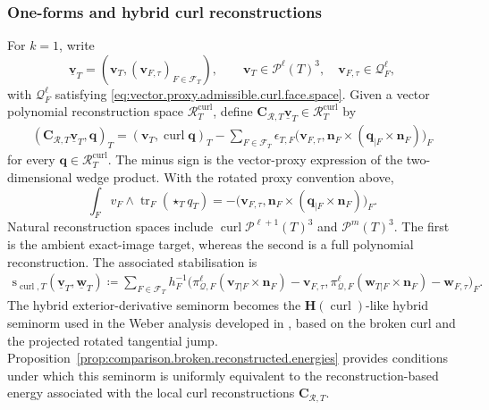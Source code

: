 \documentclass[a4paper,11pt]{article}
\theoremstyle{definition}
\newcommand{\trc}{\operatorname{tr}}
\newcommand{\epsTF}{\epsilon_{T,F}}
\begin{document}
\subsubsection{One-forms and hybrid curl reconstructions}
\label{subsec:proxy.curl}

For $k=1$, write
\[
  \underline{\boldsymbol v}_T
  =
  \left(
    \boldsymbol v_T,
    (\boldsymbol v_{F,\tau})_{F\in\mathcal F_T}
  \right),
  \qquad
  \boldsymbol v_T\in\mathcal P^\ell(T)^3,
  \quad
  \boldsymbol v_{F,\tau}\in\boldsymbol{\mathcal Q}_F^\ell,
\]
with $\boldsymbol{\mathcal Q}_F^\ell$ satisfying \eqref{eq:vector.proxy.admissible.curl.face.space}.
Given a vector polynomial reconstruction space $\boldsymbol{\mathcal R}_T^{\mathrm{curl}}$, define $\boldsymbol C_{\mathcal R,T} \underline{\boldsymbol v}_T \in \boldsymbol{\mathcal R}_T^{\mathrm{curl}}$ by
\[
\begin{aligned}
(\boldsymbol C_{\mathcal R,T}
\underline{\boldsymbol v}_T,
\boldsymbol q)_T
={}
(\boldsymbol v_T,
\operatorname{curl}\boldsymbol q)_T
-\sum_{F\in\mathcal F_T}
\epsTF
\bigl(
\boldsymbol v_{F,\tau},
\boldsymbol n_F\times
(\boldsymbol q_{|F}\times\boldsymbol n_F)
\bigr)_F
\end{aligned}
\]
for every $\boldsymbol q\in\boldsymbol{\mathcal R}_T^{\mathrm{curl}}$.
The minus sign is the vector-proxy expression of the two-dimensional wedge product.
With the rotated proxy convention above,
\[
  \int_F
  v_F\wedge\trc_F(\star_Tq_T)
  =
  -
  \bigl(
    \boldsymbol v_{F,\tau},
    \boldsymbol n_F\times
    (\boldsymbol q_{|F}\times\boldsymbol n_F)
  \bigr)_F.
\]
Natural reconstruction spaces include $\operatorname{curl}\mathcal P^{\ell+1}(T)^3$ and $\mathcal P^m(T)^3$.
The first is the ambient exact-image target, whereas the second is a full polynomial reconstruction.
The associated stabilisation is
\[
\begin{aligned}
\mathrm s_{\operatorname{curl},T}
(\underline{\boldsymbol v}_T,
\underline{\boldsymbol w}_T)
\coloneqq
\sum_{F\in\mathcal F_T}
h_F^{-1}
\bigl(
\pi_{\boldsymbol{\mathcal Q},F}^{\ell}
(\boldsymbol v_{T|F}\times\boldsymbol n_F)
-\boldsymbol v_{F,\tau},
\pi_{\boldsymbol{\mathcal Q},F}^{\ell}
(\boldsymbol w_{T|F}\times\boldsymbol n_F)
-\boldsymbol w_{F,\tau}
\bigr)_F.
\end{aligned}
\]
The hybrid exterior-derivative seminorm becomes the $\boldsymbol H(\operatorname{curl})$-like hybrid seminorm used in the Weber analysis developed in \cite{Lemaire.Pitassi:25}, based on the broken curl and the projected rotated tangential jump.
Proposition~\ref{prop:comparison.broken.reconstructed.energies} provides conditions under which this seminorm is uniformly equivalent to the reconstruction-based energy associated with the local curl reconstructions $\boldsymbol C_{\mathcal R,T}$.
\end{document}
